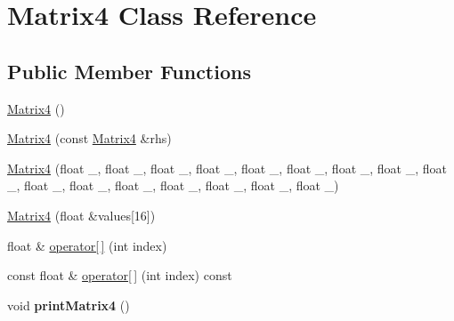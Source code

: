 \hypertarget{class_matrix4}{}\section{Matrix4 Class Reference}
\label{class_matrix4}
\subsection*{Public Member Functions}
\begin{DoxyCompactItemize}
\item 
\hyperlink{class_matrix4_a21e70a74447b9b05cf9a06400bc9c661}{Matrix4} ()
\item 
\hyperlink{class_matrix4_a524a8a7fef110500b7e56abf03473018}{Matrix4} (const \hyperlink{class_matrix4}{Matrix4} \&rhs)
\item 
\hyperlink{class_matrix4_a378e12a6d53ad29895c9d048d7152aa9}{Matrix4} (float \+\_, float \+\_, float \+\_, float \+\_, float \+\_, float \+\_, float \+\_, float \+\_, float \+\_, float \+\_, float \+\_, float \+\_, float \+\_, float \+\_, float \+\_, float \+\_)
\item 
\hyperlink{class_matrix4_a33bdf9c4d086be1c5d6889154de9c2b4}{Matrix4} (float \&values\mbox{[}16\mbox{]})
\item 
float \& \hyperlink{class_matrix4_a3e542f89134e7496dfe820ba1668b305}{operator\mbox{[}$\,$\mbox{]}} (int index)
\item 
const float \& \hyperlink{class_matrix4_ad80f68f96c8e78ea4eed23c2745d47f2}{operator\mbox{[}$\,$\mbox{]}} (int index) const 
\item 
\hypertarget{class_matrix4_a2a7f1a5d8b2396b7ab9135ccca2b2865}{}void {\bfseries print\+Matrix4} ()\label{class_matrix4_a2a7f1a5d8b2396b7ab9135ccca2b2865}

\end{DoxyCompactItemize}
